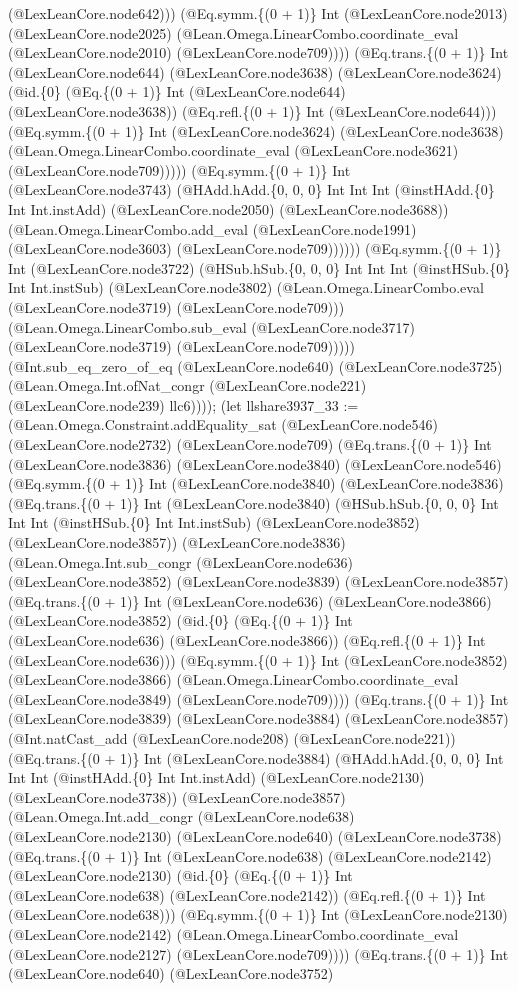 \documentclass[11pt]{article}
\begin{document}
(@LexLeanCore.node642))) (@Eq.symm.\{(0 + 1)\} Int (@LexLeanCore.node2013) (@LexLeanCore.node2025) (@Lean.Omega.LinearCombo.coordinate\_eval (@LexLeanCore.node2010) (@LexLeanCore.node709)))) (@Eq.trans.\{(0 + 1)\} Int (@LexLeanCore.node644) (@LexLeanCore.node3638) (@LexLeanCore.node3624) (@id.\{0\} (@Eq.\{(0 + 1)\} Int (@LexLeanCore.node644) (@LexLeanCore.node3638)) (@Eq.refl.\{(0 + 1)\} Int (@LexLeanCore.node644))) (@Eq.symm.\{(0 + 1)\} Int (@LexLeanCore.node3624) (@LexLeanCore.node3638) (@Lean.Omega.LinearCombo.coordinate\_eval (@LexLeanCore.node3621) (@LexLeanCore.node709))))) (@Eq.symm.\{(0 + 1)\} Int (@LexLeanCore.node3743) (@HAdd.hAdd.\{0, 0, 0\} Int Int Int (@instHAdd.\{0\} Int Int.instAdd) (@LexLeanCore.node2050) (@LexLeanCore.node3688)) (@Lean.Omega.LinearCombo.add\_eval (@LexLeanCore.node1991) (@LexLeanCore.node3603) (@LexLeanCore.node709)))))) (@Eq.symm.\{(0 + 1)\} Int (@LexLeanCore.node3722) (@HSub.hSub.\{0, 0, 0\} Int Int Int (@instHSub.\{0\} Int Int.instSub) (@LexLeanCore.node3802) (@Lean.Omega.LinearCombo.eval (@LexLeanCore.node3719) (@LexLeanCore.node709))) (@Lean.Omega.LinearCombo.sub\_eval (@LexLeanCore.node3717) (@LexLeanCore.node3719) (@LexLeanCore.node709))))) (@Int.sub\_eq\_zero\_of\_eq (@LexLeanCore.node640) (@LexLeanCore.node3725) (@Lean.Omega.Int.ofNat\_congr (@LexLeanCore.node221) (@LexLeanCore.node239) llc6)))); (let llshare3937\_33 := (@Lean.Omega.Constraint.addEquality\_sat (@LexLeanCore.node546) (@LexLeanCore.node2732) (@LexLeanCore.node709) (@Eq.trans.\{(0 + 1)\} Int (@LexLeanCore.node3836) (@LexLeanCore.node3840) (@LexLeanCore.node546) (@Eq.symm.\{(0 + 1)\} Int (@LexLeanCore.node3840) (@LexLeanCore.node3836) (@Eq.trans.\{(0 + 1)\} Int (@LexLeanCore.node3840) (@HSub.hSub.\{0, 0, 0\} Int Int Int (@instHSub.\{0\} Int Int.instSub) (@LexLeanCore.node3852) (@LexLeanCore.node3857)) (@LexLeanCore.node3836) (@Lean.Omega.Int.sub\_congr (@LexLeanCore.node636) (@LexLeanCore.node3852) (@LexLeanCore.node3839) (@LexLeanCore.node3857) (@Eq.trans.\{(0 + 1)\} Int (@LexLeanCore.node636) (@LexLeanCore.node3866) (@LexLeanCore.node3852) (@id.\{0\} (@Eq.\{(0 + 1)\} Int (@LexLeanCore.node636) (@LexLeanCore.node3866)) (@Eq.refl.\{(0 + 1)\} Int (@LexLeanCore.node636))) (@Eq.symm.\{(0 + 1)\} Int (@LexLeanCore.node3852) (@LexLeanCore.node3866) (@Lean.Omega.LinearCombo.coordinate\_eval (@LexLeanCore.node3849) (@LexLeanCore.node709)))) (@Eq.trans.\{(0 + 1)\} Int (@LexLeanCore.node3839) (@LexLeanCore.node3884) (@LexLeanCore.node3857) (@Int.natCast\_add (@LexLeanCore.node208) (@LexLeanCore.node221)) (@Eq.trans.\{(0 + 1)\} Int (@LexLeanCore.node3884) (@HAdd.hAdd.\{0, 0, 0\} Int Int Int (@instHAdd.\{0\} Int Int.instAdd) (@LexLeanCore.node2130) (@LexLeanCore.node3738)) (@LexLeanCore.node3857) (@Lean.Omega.Int.add\_congr (@LexLeanCore.node638) (@LexLeanCore.node2130) (@LexLeanCore.node640) (@LexLeanCore.node3738) (@Eq.trans.\{(0 + 1)\} Int (@LexLeanCore.node638) (@LexLeanCore.node2142) (@LexLeanCore.node2130) (@id.\{0\} (@Eq.\{(0 + 1)\} Int (@LexLeanCore.node638) (@LexLeanCore.node2142)) (@Eq.refl.\{(0 + 1)\} Int (@LexLeanCore.node638))) (@Eq.symm.\{(0 + 1)\} Int (@LexLeanCore.node2130) (@LexLeanCore.node2142) (@Lean.Omega.LinearCombo.coordinate\_eval (@LexLeanCore.node2127) (@LexLeanCore.node709)))) (@Eq.trans.\{(0 + 1)\} Int (@LexLeanCore.node640) (@LexLeanCore.node3752) 
\end{document}
